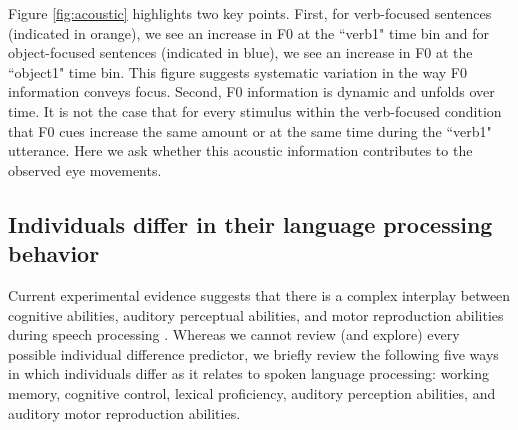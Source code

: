 Figure \ref{fig:acoustic} highlights two key points. First, for verb-focused sentences (indicated in orange), we see an increase in F0 at the ``verb1" time bin and for object-focused sentences (indicated in blue), we see an increase in F0 at the ``object1" time bin. This figure suggests systematic variation in the way F0 information conveys focus. Second, F0 information is dynamic and unfolds over time. It is not the case that for every stimulus within the verb-focused condition that F0 cues increase the same amount or at the same time during the ``verb1" utterance. Here we ask whether this acoustic information contributes to the observed eye movements.

\subsection{Individuals differ in their language processing behavior}

Current experimental evidence suggests that there is a complex interplay between cognitive abilities, auditory perceptual abilities, and motor reproduction abilities during speech processing \citep{saito2022does, bramlett_wiener_24_speechprosody, bakkouche2025effects, Kachlicka_Saito_Tierney_2019}. Whereas we cannot review (and explore) every possible individual difference predictor, we briefly review the following five ways in which individuals differ as it relates to spoken language processing: working memory, cognitive control, lexical proficiency, auditory perception abilities, and auditory motor reproduction abilities.


